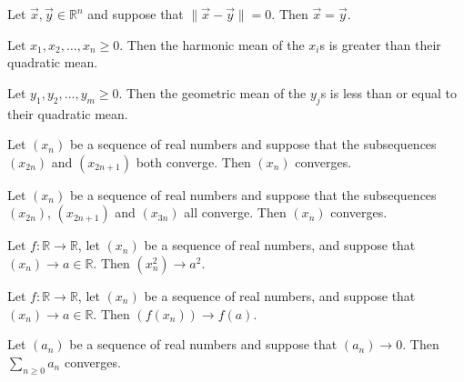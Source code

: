 \begin{chapex} %
\label{cqRealNumbersASNBegin}
Let $\vec x, \vec y \in \mathbb{R}^n$ and suppose that $\lVert \vec x - \vec y \rVert = 0$. Then $\vec x = \vec y$.
\end{chapex}

\begin{chapex} %
Let $x_1, x_2, \dots, x_n \ge 0$. Then the harmonic mean of the $x_i$s is greater than their quadratic mean.
\end{chapex}

\begin{chapex} %
Let $y_1, y_2, \dots, y_m \ge 0$. Then the geometric mean of the $y_j$s is less than or equal to their quadratic mean.
\end{chapex}

\begin{chapex} %
Let $(x_n)$ be a sequence of real numbers and suppose that the subsequences $(x_{2n})$ and $(x_{2n+1})$ both converge. Then $(x_n)$ converges.
\end{chapex}

\begin{chapex} %
Let $(x_n)$ be a sequence of real numbers and suppose that the subsequences $(x_{2n})$, $(x_{2n+1})$ and $(x_{3n})$ all converge. Then $(x_n)$ converges.
\end{chapex}

\begin{chapex} %
Let $f : \mathbb{R} \to \mathbb{R}$, let $(x_n)$ be a sequence of real numbers, and suppose that $(x_n) \to a \in \mathbb{R}$. Then $(x_n^2) \to a^2$.
\end{chapex}

\begin{chapex} %
Let $f : \mathbb{R} \to \mathbb{R}$, let $(x_n)$ be a sequence of real numbers, and suppose that $(x_n) \to a \in \mathbb{R}$. Then $(f(x_n)) \to f(a)$.
\end{chapex}

\begin{chapex} %
\label{cqRealNumbersASNEnd}
Let $(a_n)$ be a sequence of real numbers and suppose that $(a_n) \to 0$. Then $\sum_{n \ge 0} a_n$ converges.
\end{chapex}